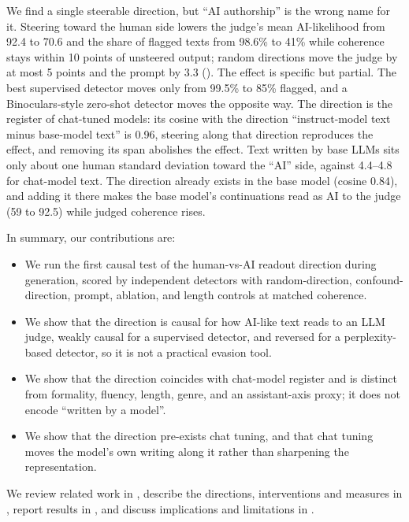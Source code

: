 We find a single steerable direction, but ``AI authorship'' is the wrong name for it.
Steering toward the human side lowers the judge's mean AI-likelihood from 92.4 to 70.6 and the share of flagged texts from 98.6\% to 41\% while coherence stays within 10 points of unsteered output; random directions move the judge by at most 5 points and the prompt by 3.3 ().
The effect is specific but partial.
The best supervised detector moves only from 99.5\% to 85\% flagged, and a Binoculars-style zero-shot detector moves the opposite way.
The direction is the register of chat-tuned models: its cosine with the direction ``instruct-model text minus base-model text'' is 0.96, steering along that direction reproduces the effect, and removing its span abolishes the effect.
Text written by base LLMs sits only about one human standard deviation toward the ``AI'' side, against 4.4--4.8 for chat-model text.
The direction already exists in the base model (cosine 0.84), and adding it there makes the base model's continuations read as AI to the judge (59 to 92.5) while judged coherence rises.

In summary, our contributions are:
\begin{itemize}[leftmargin=*,itemsep=0pt,topsep=0pt]
    \item We run the first causal test of the human-vs-AI readout direction during generation, scored by independent detectors with random-direction, confound-direction, prompt, ablation, and length controls at matched coherence.
    \item We show that the direction is causal for how AI-like text reads to an LLM judge, weakly causal for a supervised detector, and reversed for a perplexity-based detector, so it is not a practical evasion tool.
    \item We show that the direction coincides with chat-model register and is distinct from formality, fluency, length, genre, and an assistant-axis proxy; it does not encode ``written by a model''.
    \item We show that the direction pre-exists chat tuning, and that chat tuning moves the model's own writing along it rather than sharpening the representation.
\end{itemize}

We review related work in , describe the directions, interventions and measures in , report results in , and discuss implications and limitations in .
